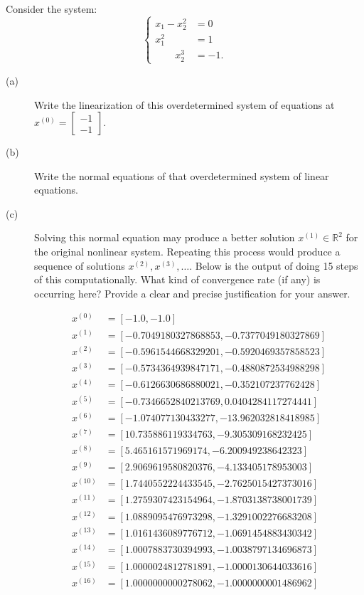 \documentclass[11pt]{article}
\begin{document}
  Consider the system:
$$ \begin{cases} 
x_1 - x_2^2 &= 0\\
x^2_1 \qquad & = 1\\
\qquad x^3_2 & = -1.
\end{cases}$$
\begin{description}
    \item[(a)] Write the linearization of this overdetermined system of equations at $x^{(0)} = \begin{bmatrix} -1 \\ -1\end{bmatrix}$.

    \vskip0.5cm


    \item[(b)] Write the normal equations of that overdetermined system of linear equations.

    \vskip0.5cm


    \item[(c)] Solving this normal equation may produce a better solution $x^{(1)}\in\mathbb{R}^2$ for the original nonlinear system. Repeating this process would produce a sequence of solutions $x^{(2)},x^{(3)},\dots$. Below is the output of doing 15 steps of this computationally. What kind of convergence rate (if any) is occurring here? Provide a clear and precise justification for your answer.
    
    \footnotesize
    \begin{align*}
        x^{(0)} &= [-1.0, -1.0]\\
        x^{(1)} &= [-0.7049180327868853, -0.7377049180327869]\\
        x^{(2)} &= [-0.5961544668329201, -0.5920469357858523]\\
        x^{(3)} &= [-0.5734364939847171, -0.4880872534988298]\\
        x^{(4)} &= [-0.6126630686880021, -0.352107237762428]\\
        x^{(5)} &= [-0.7346652840213769, 0.0404284117274441]\\
        x^{(6)} &= [-1.074077130433277, -13.962032818418985]\\
        x^{(7)} &= [10.735886119334763, -9.305309168232425]\\
        x^{(8)} &= [5.465161571969174, -6.200949238642323]\\
        x^{(9)} &= [2.9069619580820376, -4.133405178953003]\\
        x^{(10)} &= [1.7440552224433545, -2.7625015427373016]\\
        x^{(11)} &= [1.2759307423154964, -1.8703138738001739]\\
        x^{(12)} &= [1.0889095476973298, -1.3291002276683208]\\
        x^{(13)} &= [1.0161436089776712, -1.0691454883430342]\\
        x^{(14)} &= [1.0007883730394993, -1.0038797134696873]\\
        x^{(15)} &= [1.0000024812781891, -1.0000130644033616]\\
        x^{(16)} &= [1.0000000000278062, -1.0000000001486962]
    \end{align*}
\end{description}
\end{document}
